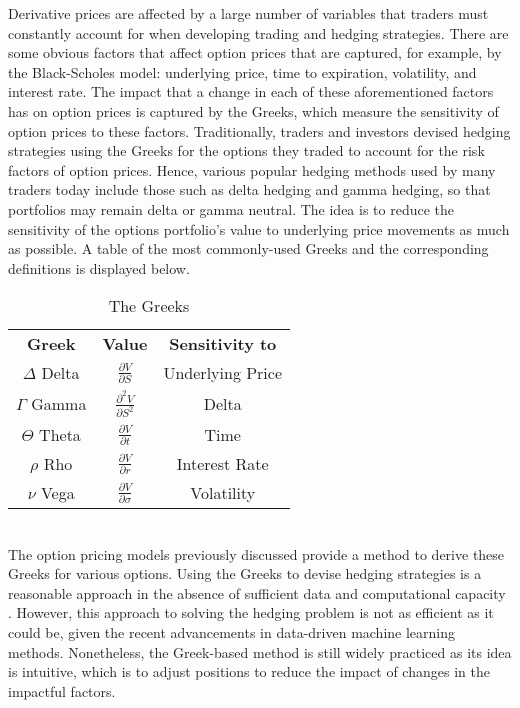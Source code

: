 Derivative prices are affected by a large number of variables that traders must constantly account for when developing trading and hedging strategies. There are some obvious factors that affect option prices that are captured, for example, by the Black-Scholes model: underlying price, time to expiration, volatility, and interest rate. The impact that a change in each of these aforementioned factors has on option prices is captured by the Greeks, which measure the sensitivity of option prices to these factors. Traditionally, traders and investors devised hedging strategies using the Greeks for the options they traded to account for the risk factors of option prices. Hence, various popular hedging methods used by many traders today include those such as delta hedging and gamma hedging, so that portfolios may remain delta or gamma neutral. The idea is to reduce the sensitivity of the options portfolio's value to underlying price movements as much as possible. A table of the most commonly-used Greeks and the corresponding definitions is displayed below.
\begin{table}[h]
\begin{center}
\begin{tabular}{c|c|c} 
\textbf{Greek} & \textbf{Value} & \textbf{Sensitivity to}\\[5pt]
$\Delta$ Delta & $\frac{\partial{V}}{\partial{S}}$ & Underlying Price\\[5pt]
$\Gamma$ Gamma & $\frac{\partial^2{V}}{\partial{S}^2}$ & Delta\\[5pt]
$\Theta$ Theta & $\frac{\partial{V}}{\partial{t}}$ & Time\\[5pt]
$\rho$ Rho & $\frac{\partial{V}}{\partial{r}}$ & Interest Rate\\[5pt]
$\nu$ Vega & $\frac{\partial{V}}{\partial{\sigma}}$ & Volatility\\[5pt]
\end{tabular}
\caption{The Greeks}
\end{center}
\end{table}
\\
\noindent The option pricing models previously discussed provide a method to derive these Greeks for various options. Using the Greeks to devise hedging strategies is a reasonable approach in the absence of sufficient data and computational capacity \cite{deep-hedging-ppt}. However, this approach to solving the hedging problem is not as efficient as it could be, given the recent advancements in data-driven machine learning methods. Nonetheless, the Greek-based method is still widely practiced as its idea is intuitive, which is to adjust positions to reduce the impact of changes in the impactful factors.

